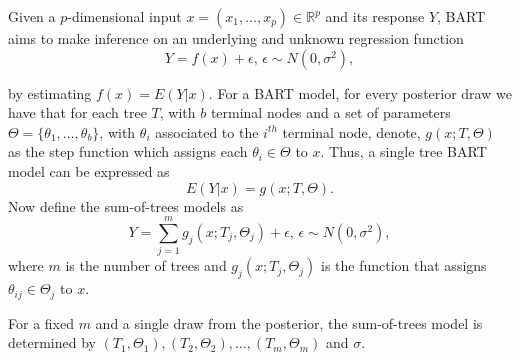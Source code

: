 Given a $p$-dimensional input $x=(x_{1}, \ldots, x_{p})\in\mathbb{R}^p$ and its response $Y$, BART \cite{BART} aims to make inference on an underlying and unknown regression function
\begin{equation}
    Y = f(x) + \epsilon\text{, }\epsilon \sim N(0,\sigma^{2}),
\label{eq:underlying function}
\end{equation}

by estimating $f(x) = E(Y|x)$. For a BART model, for every posterior draw we have that for each tree $T$, with $b$ terminal nodes and a set of parameters $\Theta = \{\theta_1, \ldots, \theta_b\}$, with $\theta_i$ associated to the $i^{th}$ terminal node, denote,  $g(x; T, \Theta)$ as the step function which assigns each $\theta_i \in \Theta$ to $x$. Thus, a single tree BART model can be expressed as 
\begin{equation}
    E(Y|x) = g(x; T, \Theta).
\label{eq:single tree}
\end{equation}
Now define the sum-of-trees models as
\begin{equation}
    Y = \sum_{j = 1}^{m}g_j(x; T_j, \Theta_j) + \epsilon\text{, }\epsilon \sim N(0, \sigma^2),
\label{eq:single tree}
\end{equation}
where $m$ is the number of trees and $g_j(x; T_j, \Theta_j)$ is the function that assigns $\theta_{ij} \in \Theta_j$ to $x$.

For a fixed $m$ and a single draw from the posterior, the sum-of-trees model is determined by $(T_1, \Theta_1), (T_2, \Theta_2), \ldots, (T_m, \Theta_m)$ and $\sigma$.




